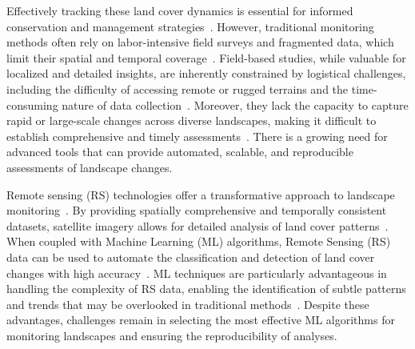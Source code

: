 \documentclass[jimaging,article,accept,pdftex,oneauthor]{Definitions/mdpi}
\begin{document}
Effectively tracking these land cover dynamics is essential for informed conservation and management strategies~\cite{gutman2004land, AMICI201738}. However, traditional monitoring methods often rely on labor-intensive field surveys and fragmented {data}, which limit their spatial and temporal coverage~\cite{Lelli2018,Lelli,GLASER2024108798}. Field-based studies, while valuable for localized and detailed insights, are inherently constrained by logistical challenges, including the difficulty of accessing remote or rugged terrains and the time-consuming nature of data collection~\cite{Alessi}. Moreover, they lack the capacity to capture rapid or large-scale changes across diverse landscapes, making it difficult to establish comprehensive and timely assessments~\cite{Knollova2024,constrmater3010008}. There is a growing need for advanced tools that can provide automated, scalable, and reproducible assessments of landscape changes.

Remote sensing (RS) technologies offer a transformative approach to landscape monitoring~\cite{BALDO2023101922,ZHU2022113266,earth5030024}. By providing spatially comprehensive and temporally consistent datasets, satellite imagery allows for detailed analysis of land cover patterns~\cite{ANSELMETTO2024104973,BRACCHETTI2012157,jmse12081279}. When coupled with Machine Learning (ML) algorithms, Remote Sensing (RS) data can be used to automate the classification and detection of land cover changes with high accuracy~\cite{w16081141}. ML techniques are particularly advantageous in handling the complexity of RS {data}, enabling the identification of subtle patterns and trends that may be overlooked {in} traditional methods~\cite{BAOPHAM202417,jmse12050709}. Despite these advantages, challenges remain in selecting the most effective ML algorithms for {monitoring} landscapes and ensuring the reproducibility of analyses.
\end{document}
